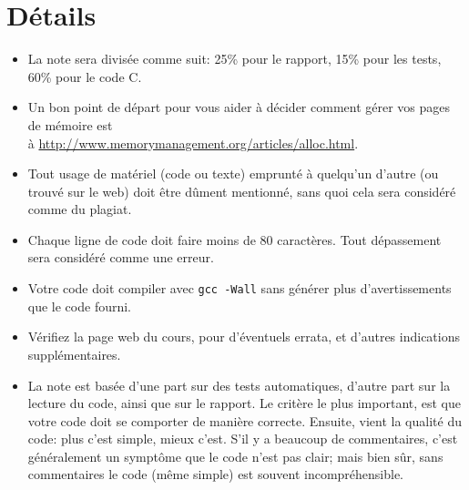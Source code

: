 \documentclass{article}
\begin{document}
\section{Détails}
\begin{itemize}
\item La note sera divisée comme suit: 25\% pour le rapport, 15\% pour les
  tests, 60\% pour le code C.

\item Un bon point de départ pour vous aider à décider comment gérer vos
  pages de mémoire est
  \\ à \url{http://www.memorymanagement.org/articles/alloc.html}.

\item Tout usage de matériel (code ou texte) emprunté à quelqu'un d'autre
  (ou trouvé sur le web) doit être dûment mentionné, sans quoi cela sera
  considéré comme du plagiat.

\item Chaque ligne de code doit faire moins de 80 caractères.
  Tout dépassement sera considéré comme une erreur.

\item Votre code doit compiler avec \texttt{gcc -Wall} sans
  générer plus d'avertissements que le code fourni.

\item Vérifiez la page web du cours, pour d'éventuels errata, et d'autres
  indications supplémentaires.

\item La note est basée d'une part sur des tests automatiques, d'autre part
  sur la lecture du code, ainsi que sur le rapport.  Le critère le plus
  important, est que votre code doit se comporter de manière correcte.
  Ensuite, vient la qualité du code: plus c'est simple, mieux c'est.
  S'il y a beaucoup de commentaires, c'est généralement un symptôme que le
  code n'est pas clair; mais bien sûr, sans commentaires le code (même
  simple) est souvent incompréhensible.
\end{itemize}
\end{document}
